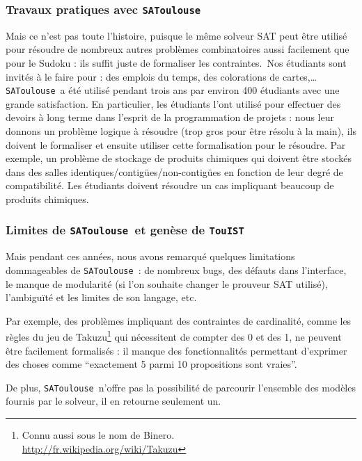 \documentclass{iaf}
\newcommand{\satoulouse}{{\sc Satoulouse}\xspace}
\renewcommand{\satoulouse}{{\sc \texttt {SAToulouse}}}
\newcommand{\nameTool}{{\sc \texttt {TouIST}}}
\begin{document}
\subsubsection*{Travaux pratiques avec \satoulouse}
Mais ce n'est pas toute l'histoire, puisque le m\^eme solveur SAT peut \^etre utilis\'e pour r\'esoudre de nombreux autres probl\`emes combinatoires aussi facilement que pour le Sudoku : ils suffit juste de formaliser les contraintes.\ Nos \'etudiants sont invit\'es \`a le faire pour : des emplois du temps, des colorations de cartes,\ldots \satoulouse\ a \'et\'e utilis\'e pendant trois ans par environ 400 \'etudiants avec une grande satisfaction. En particulier, les \'etudiants l'ont utilis\'e pour effectuer des devoirs \`a long terme dans l'esprit de la programmation de projets : nous leur donnons un probl\`eme logique \`a r\'esoudre (trop gros pour \^etre r\'esolu \`a la main), ils doivent le formaliser et ensuite utiliser cette formalisation pour le r\'esoudre. Par exemple, un probl\`eme de stockage de produits chimiques qui doivent \^etre stock\'es dans des salles identiques/contig\"ues/non-contig\"ues en fonction de leur degr\'e de compatibilit\'e. Les \'etudiants doivent r\'esoudre un cas impliquant beaucoup de produits chimiques.


\subsubsection*{Limites de \satoulouse\ et gen\`ese de \nameTool}
Mais pendant ces ann\'ees, nous avons remarqu\'e quelques limitations dommageables de \satoulouse\ : de nombreux bugs, des d\'efauts dans l'interface, le manque de modularit\'e (si l'on souhaite changer le prouveur SAT utilis\'e), l'ambigu\"it\'e et les limites de son langage, etc.

Par exemple, des probl\`{e}mes impliquant des contraintes de cardinalit\'{e}, comme les r\`{e}gles du jeu de Takuzu\footnote{Connu aussi sous le nom de Binero.\\ \url{http://fr.wikipedia.org/wiki/Takuzu}} qui n\'{e}cessitent de compter des 0 et des 1, ne peuvent \^{e}tre facilement formalis\'{e}s : il manque des fonctionnalit\'{e}s permettant d'exprimer des choses comme ``exactement 5 parmi 10 propositions sont vraies''. 

De plus, \satoulouse\ n'offre pas la possibilit\'{e} de parcourir l'ensemble des mod\`{e}les fournis par le solveur, il en retourne seulement un.
\end{document}
